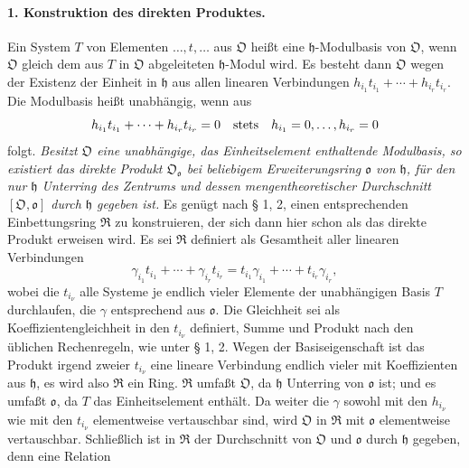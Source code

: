 \paragraph{1. Konstruktion des direkten Produktes.}
Ein System $T$ von Elementen $\ldots,t,\ldots$ aus $\mathfrak O$ heißt eine $\mathfrak h$-Modulbasis von $\mathfrak O$, wenn $\mathfrak O$ gleich dem aus $T$ in $\mathfrak O$ abgeleiteten $\mathfrak h$-Modul wird. Es besteht dann $\mathfrak O$ wegen der Existenz der Einheit in $\mathfrak h$ aus allen linearen Verbindungen $h_{i_1}t_{i_1}+\cdots+h_{i_r}t_{i_r}$. Die Modulbasis heißt unabhängig, wenn aus
\[
h_{i_1}t_{i_1}+\cdots+h_{i_r}t_{i_r}=0
\quad\hbox{stets}\quad
h_{i_1}=0,\ldots,h_{i_r}=0
\]
folgt. \emph{Besitzt $\mathfrak O$ eine unabhängige, das Einheitselement enthaltende Modulbasis, so existiert das direkte Produkt $\mathfrak O_{\mathfrak o}$ bei beliebigem Erweiterungsring $\mathfrak o$ von $\mathfrak h$, für den nur $\mathfrak h$ Unterring des Zentrums und dessen mengentheoretischer Durchschnitt $[\mathfrak O,\mathfrak o]$ durch $\mathfrak h$ gegeben ist.} Es genügt nach § 1, 2, einen entsprechenden Einbettungsring $\mathfrak R$ zu konstruieren, der sich dann hier schon als das direkte Produkt erweisen wird. Es sei $\mathfrak R$ definiert als Gesamtheit aller linearen Verbindungen
\[
\gamma_{i_1}t_{i_1}+\cdots+\gamma_{i_r}t_{i_r}
=t_{i_1}\gamma_{i_1}+\cdots+t_{i_r}\gamma_{i_r},
\]
wobei die $t_{i_\nu}$ alle Systeme je endlich vieler Elemente der unabhängigen Basis $T$ durchlaufen, die $\gamma$ entsprechend aus $\mathfrak o$. Die Gleichheit sei als Koeffizientengleichheit in den $t_{i_\nu}$ definiert, Summe und Produkt nach den üblichen Rechenregeln, wie unter § 1, 2. Wegen der Basiseigenschaft ist das Produkt irgend zweier $t_{i_\nu}$ eine lineare Verbindung endlich vieler mit Koeffizienten aus $\mathfrak h$, es wird also $\mathfrak R$ ein Ring. $\mathfrak R$ umfaßt $\mathfrak O$, da $\mathfrak h$ Unterring von $\mathfrak o$ ist; und es umfaßt $\mathfrak o$, da $T$ das Einheitselement enthält. Da weiter die $\gamma$ sowohl mit den $h_{i_\nu}$ wie mit den $t_{i_\nu}$ elementweise vertauschbar sind, wird $\mathfrak O$ in $\mathfrak R$ mit $\mathfrak o$ elementweise vertauschbar. Schließlich ist in $\mathfrak R$ der Durchschnitt von $\mathfrak O$ und $\mathfrak o$ durch $\mathfrak h$ gegeben, denn eine Relation
